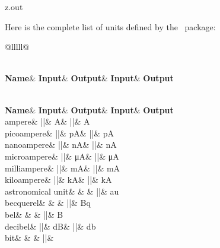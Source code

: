 \MyIO


\begin{VerbatimOut}{z.out}

Here is the complete list of units defined
by the \siunitxLogo\ package:

{
  \newcommand{\q}{\quad}
  \begin{longtable}{@{}lllll@{}}%
      \caption{Units}\\
      \textbf{Name}& \textbf{Input}& \textbf{Output}& \textbf{Input}& \textbf{Output}\\[6pt]
    \endfirsthead
      \caption[]{~\emph{continued}}\\
      \textbf{Name}& \textbf{Input}& \textbf{Output}& \textbf{Input}& \textbf{Output}\\[6pt]
    \endhead
    \endfoot
    \endlastfoot
    ampere&               |\A|&    \unit{\A}&    |\ampere|&             \unit{\ampere}\\
    \q picoampere&        |\pA|&   \unit{\pA}&   |\pico\ampere|&        \unit{\pico\ampere}\\
    \q nanoampere&        |\nA|&   \unit{\nA}&   |\nano\ampere|&        \unit{\nano\ampere}\\
    \q microampere&       |\uA|&   \unit{\uA}&   |\micro\ampere|&       \unit{\micro\ampere}\\
    \q milliampere&       |\mA|&   \unit{\mA}&   |\milli\ampere|&       \unit{\milli\ampere}\\
    \q kiloampere&        |\kA|&   \unit{\kA}&   |\kilo\ampere|&        \unit{\kilo\ampere}\\[6pt]
    astronomical unit&    &        &             |\astronomicalunit|&   \unit{\astronomicalunit}\\[6pt]
    becquerel&            &        &             |\becquerel|&          \unit{\becquerel}\\[6pt]
    bel&                  &        &             |\bel|&                \unit{\bel}\\
    \q decibel&           |\dB|&   \unit{\dB}&   |\decibel|&            \unit{\decibel}\\[6pt]
    bit&                  &        &             |\bit|&                \unit{\bit}\\[6pt]

\end{longtable}}
\end{VerbatimOut}
